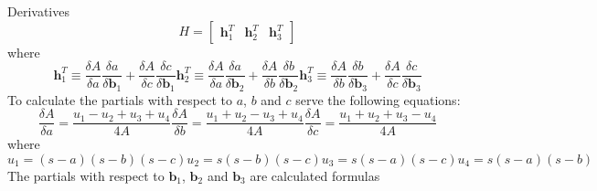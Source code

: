 \documentclass[12pt,a4paper,oneside]{article}
\begin{document}
Derivatives
\begin{equation}
H = \begin{bmatrix}
\bm{h}_1^T & \bm{h}_2^T & \bm{h}_3^T
\end{bmatrix}
\end{equation}
where
\begin{subequations}
\begin{equation}
\bm{h}_1^T \equiv \frac{\delta A}{\delta a}\frac{\delta a}{\delta\bm{b}_1} + \frac{\delta A}{\delta c}\frac{\delta c}{\delta\bm{b}_1}
\end{equation}
\begin{equation}
\bm{h}_2^T \equiv \frac{\delta A}{\delta a}\frac{\delta a}{\delta\bm{b}_2} + \frac{\delta A}{\delta b}\frac{\delta b}{\delta\bm{b}_2}
\end{equation}
\begin{equation}
\bm{h}_3^T \equiv \frac{\delta A}{\delta b}\frac{\delta b}{\delta\bm{b}_3} + \frac{\delta A}{\delta c}\frac{\delta c}{\delta\bm{b}_3} 
\end{equation}
\end{subequations}
To calculate the partials with respect to $a$, $b$ and $c$ serve the following equations:
\begin{subequations}
\begin{equation}
\frac{\delta A}{\delta a} = \frac{u_1 - u_2 + u_3 + u_4}{4A}
\end{equation}
\begin{equation}
\frac{\delta A}{\delta b} = \frac{u_1 + u_2 - u_3 + u_4}{4A}
\end{equation}
\begin{equation}
\frac{\delta A}{\delta c} = \frac{u_1 + u_2 + u_3 - u_4}{4A}
\end{equation}
\end{subequations}
where
\begin{subequations}
\begin{equation}
u_1 = (s - a)(s - b)(s - c)
\end{equation}
\begin{equation}
u_2 = s(s - b)(s - c)
\end{equation}
\begin{equation}
u_3 = s(s - a)(s - c)
\end{equation}
\begin{equation}
u_4 = s(s - a)(s - b)
\end{equation}
\end{subequations}
The partials with respect to $\bm{b}_1$, $\bm{b}_2$ and $\bm{b}_3$ are calculated formulas
\end{document}
